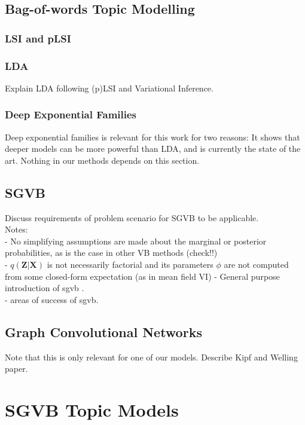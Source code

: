 \documentclass{report}
\begin{document}
\section{Bag-of-words Topic Modelling}

\subsection{LSI and pLSI}
\subsection{LDA}
Explain LDA following (p)LSI and Variational Inference.
\subsection{Deep Exponential Families}

Deep exponential families is relevant for this work for two reasons: It shows that deeper models can be more powerful than LDA, and is currently the state of the art. Nothing in our methods depends on this section.


\section{SGVB}\label{sgvb_section}

Discuss requirements of problem scenario for SGVB to be applicable. \\

Notes:\\
- No simplifying assumptions are made about the marginal or posterior probabilities, as is the case in other VB methods (check!!) \\
- $q(\mathbf{Z}|\mathbf{X})$ is not necessarily factorial and its parameters $\phi$ are not computed from some closed-form expectation (as in mean field VI)
- General purpose introduction of sgvb . \\

- areas of success of sgvb.




\section{Graph Convolutional Networks}
Note that this is only relevant for one of our models. Describe Kipf and Welling paper.
\chapter{SGVB Topic Models}
\end{document}
